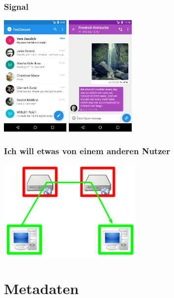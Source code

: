 \documentclass[12pt]{beamer}
\begin{document}
\begin{frame}
  \frametitle{Signal}
    \begin{center}
      \includegraphics[height=6cm]{img/signal1.png}
      \hspace{0.5cm}
      \includegraphics[height=6cm]{img/signal2.png}
    \end{center}
\end{frame}

\begin{frame}
  \frametitle{Ich will etwas von einem anderen Nutzer}
    \begin{center}
      \includegraphics[height=5cm]{img/fed-end-to-end.png}
    \end{center}
\end{frame}

\section{Metadaten}
\end{document}
